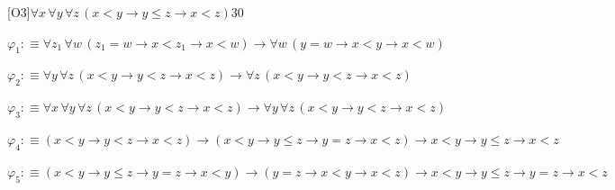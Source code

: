 \begin{fullproof}{[O3]}{$\forall x\,\forall y\,\forall z\,(x < y \to y \leq z \to x < z)$}{30}
\begin{ptree}
\end{ptree}
\begin{abbrevlist}
\item $\varphi_{1} :\equiv \forall z_{1}\,\forall w\,(z_{1} = w \to x < z_{1} \to x < w) \to \forall w\,(y = w \to x < y \to x < w)$
\item $\varphi_{2} :\equiv \forall y\,\forall z\,(x < y \to y < z \to x < z) \to \forall z\,(x < y \to y < z \to x < z)$
\item $\varphi_{3} :\equiv \forall x\,\forall y\,\forall z\,(x < y \to y < z \to x < z) \to \forall y\,\forall z\,(x < y \to y < z \to x < z)$
\item $\varphi_{4} :\equiv (x < y \to y < z \to x < z) \to (x < y \to y \leq z \to y = z \to x < z) \to x < y \to y \leq z \to x < z$
\item $\varphi_{5} :\equiv (x < y \to y \leq z \to y = z \to x < y) \to (y = z \to x < y \to x < z) \to x < y \to y \leq z \to y = z \to x < z$
\end{abbrevlist}
\end{fullproof}
